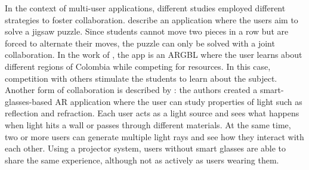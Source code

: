In the context of multi-user applications, different studies employed different strategies to foster collaboration. \cite{boonbrahm2016interactive} describe an application where the users aim to solve a jigsaw puzzle. Since students cannot move two pieces in a row but are forced to alternate their moves, the puzzle can only be solved with a joint collaboration. In the work of  \cite{ortiz2018evaluation}, the app is an \gls{ARGBL} where the user learns about different regions of Colombia while competing for resources. In this case, competition with others stimulate the students to learn about the subject. Another form of collaboration is described by \cite{oh2016designing}: the authors created a smart-glasses-based AR application where the user can study properties of light such as reflection and refraction. Each user acts as a light source and sees what happens when light hits a wall or passes through different materials. At the same time, two or more users can generate multiple light rays and see how they interact with each other. Using a projector system, users without smart glasses are able to share the same experience, although not as actively as users wearing them.